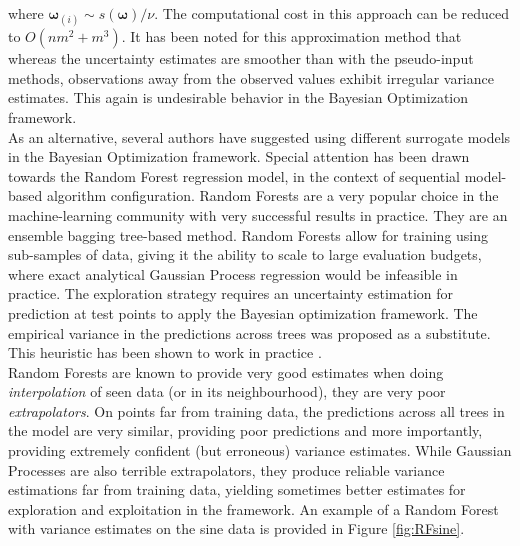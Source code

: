 \documentclass[10pt,a4paper,twoside]{book}
\begin{document}
where $\boldsymbol{\omega}_{(i)} \sim s(\boldsymbol{\omega})/\nu$. The computational cost in this approach can be reduced to $O(nm^2 + m^3)$. It has been noted for this approximation method that whereas the uncertainty estimates are smoother than with the pseudo-input methods, observations away from the observed values exhibit irregular variance estimates. This again is undesirable behavior in the Bayesian Optimization framework.\\

As an alternative, several authors \cite{Hutter2011} have suggested using different surrogate models in the Bayesian Optimization framework. Special attention has been drawn towards the Random Forest regression model, in the context of sequential model-based algorithm configuration. Random Forests \cite{Breiman2001} are a very popular choice in the machine-learning community with very successful results in practice. They are an ensemble bagging tree-based method. Random Forests allow for training using sub-samples of data, giving it the ability to scale to large evaluation budgets, where exact analytical Gaussian Process regression would be infeasible in practice. The exploration strategy requires an uncertainty estimation for prediction at test points to apply the Bayesian optimization framework. The empirical variance in the predictions across trees was proposed as a substitute. This heuristic has been shown to work in practice \cite{Hutter2011}.\\

Random Forests are known to provide very good estimates when doing \textit{interpolation} of seen data (or in its neighbourhood), they are very poor \textit{extrapolators}. On points far from training data, the predictions across all trees in the model are very similar, providing poor predictions and more importantly, providing extremely confident (but erroneous) variance estimates. While Gaussian Processes are also terrible extrapolators, they produce reliable variance estimations far from training data, yielding sometimes better estimates for exploration and exploitation in the framework. An example of a Random Forest with variance estimates on the sine data is provided in Figure \ref{fig:RFsine}.\\
\end{document}
